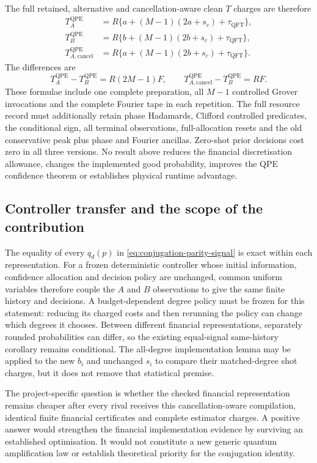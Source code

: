 The full retained, alternative and cancellation-aware clean $T$
charges are therefore
\begin{align}
 T_A^{\mathrm{QPE}}
 &=R\{a+(M-1)(2a+s_c)+\tau_{\mathrm{QFT}}\},
 \label{eq:conjugation-retained-qpe-cost}\\
 T_B^{\mathrm{QPE}}
 &=R\{b+(M-1)(2b+s_c)+\tau_{\mathrm{QFT}}\},
 \label{eq:conjugation-dirty-qpe-cost}\\
 T_{A,\mathrm{cancel}}^{\mathrm{QPE}}
 &=R\{a+(M-1)(2b+s_c)+\tau_{\mathrm{QFT}}\}.
 \label{eq:conjugation-clean-qpe-cost}
\end{align}
The differences are
\begin{equation}
 T_A^{\mathrm{QPE}}-T_B^{\mathrm{QPE}}=R(2M-1)F,
 \qquad
 T_{A,\mathrm{cancel}}^{\mathrm{QPE}}-T_B^{\mathrm{QPE}}=RF.
 \label{eq:conjugation-qpe-difference}
\end{equation}
These formulae include one complete preparation, all $M-1$ controlled
Grover invocations and the complete Fourier tape in each repetition.
The full resource record must additionally retain phase Hadamards,
Clifford controlled predicates, the conditional sign, all terminal
observations, full-allocation resets and the old conservative peak
plus phase and Fourier ancillas. Zero-shot prior decisions cost zero
in all three versions. No result above reduces the financial
discretisation allowance, changes the implemented good probability,
improves the QPE confidence theorem or establishes physical runtime
advantage.

\subsection{Controller transfer and the scope of the contribution}

The equality of every $q_d(p)$ in
\eqref{eq:conjugation-parity-signal} is exact within each representation.
For a frozen deterministic controller whose initial information,
confidence allocation and decision policy are unchanged, common
uniform variables therefore couple the $A$ and $B$ observations to
give the same finite history and decisions. A budget-dependent degree
policy must be frozen for this statement: reducing its charged costs
and then rerunning the policy can change which degrees it chooses.
Between different financial representations, separately rounded
probabilities can differ, so the existing equal-signal same-history
corollary remains conditional. The all-degree implementation lemma
may be applied to the new $b_i$ and unchanged $s_i$ to compare their
matched-degree shot charges, but it does not remove that statistical
premise.

The project-specific question is whether the checked financial
representation remains cheaper after every rival receives this
cancellation-aware compilation, identical finite financial
certificates and complete estimator charges. A positive answer would
strengthen the financial implementation evidence by surviving an
established optimisation. It would not constitute a new generic
quantum amplification law or establish theoretical priority for the
conjugation identity.
